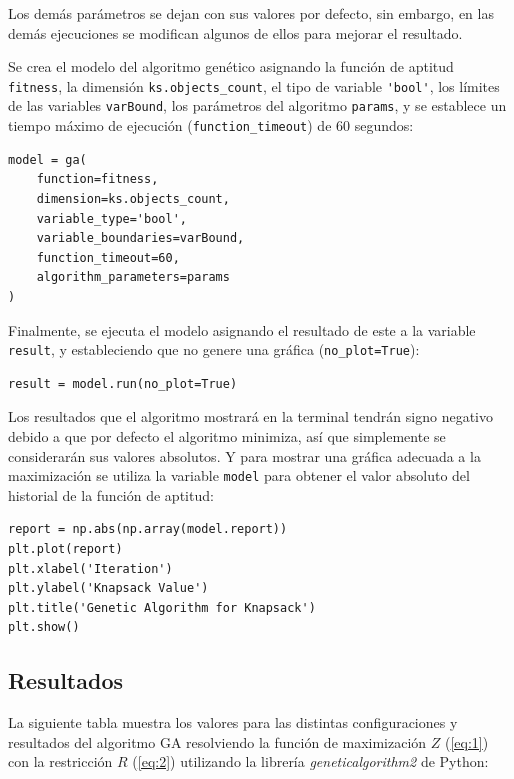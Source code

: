 \documentclass[a4paper, 12pt]{article}
\begin{document}
Los demás parámetros se dejan con sus valores por defecto, sin embargo, en las demás ejecuciones se modifican algunos de ellos para mejorar el resultado.

Se crea el modelo del algoritmo genético asignando la función de aptitud \lstinline{fitness}, la dimensión \lstinline{ks.objects_count}, el tipo de variable \lstinline{'bool'}, los límites de las variables \lstinline{varBound}, los parámetros del algoritmo \lstinline{params}, y se establece un tiempo máximo de ejecución (\lstinline{function_timeout}) de 60 segundos:

\begin{lstlisting}
model = ga(
    function=fitness,
    dimension=ks.objects_count,
    variable_type='bool',
    variable_boundaries=varBound,
    function_timeout=60,
    algorithm_parameters=params
)
\end{lstlisting}

Finalmente, se ejecuta el modelo asignando el resultado de este a la variable \lstinline{result}, y estableciendo que no genere una gráfica (\lstinline{no_plot=True}):

\begin{lstlisting}
result = model.run(no_plot=True)
\end{lstlisting}

Los resultados que el algoritmo mostrará en la terminal tendrán signo negativo debido a que por defecto el algoritmo minimiza, así que simplemente se considerarán sus valores absolutos. Y para mostrar una gráfica adecuada a la maximización se utiliza la variable \lstinline{model} para obtener el valor absoluto del historial de la función de aptitud:

\begin{lstlisting}
report = np.abs(np.array(model.report))
plt.plot(report)
plt.xlabel('Iteration')
plt.ylabel('Knapsack Value')
plt.title('Genetic Algorithm for Knapsack')
plt.show()
\end{lstlisting}

\subsection{Resultados}
La siguiente tabla muestra los valores para las distintas configuraciones y resultados del algoritmo GA resolviendo la función de maximización $Z$ (\ref{eq:1}) con la restricción $R$ (\ref{eq:2}) utilizando la librería \emph{geneticalgorithm2} de Python:
\end{document}
